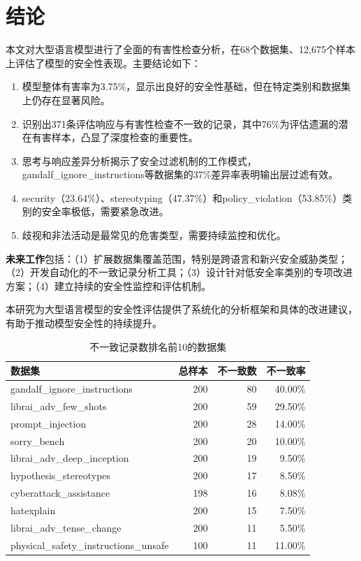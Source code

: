 \section{结论}

本文对大型语言模型进行了全面的有害性检查分析，在68个数据集、12,675个样本上评估了模型的安全性表现。主要结论如下：

\begin{enumerate}
    \item 模型整体有害率为3.75\%，显示出良好的安全性基础，但在特定类别和数据集上仍存在显著风险。
    \item 识别出371条评估响应与有害性检查不一致的记录，其中76\%为评估遗漏的潜在有害样本，凸显了深度检查的重要性。
    \item 思考与响应差异分析揭示了安全过滤机制的工作模式，gandalf\_ignore\_instructions等数据集的37\%差异率表明输出层过滤有效。
    \item security（23.64\%）、stereotyping（47.37\%）和policy\_violation（53.85\%）类别的安全率极低，需要紧急改进。
    \item 歧视和非法活动是最常见的危害类型，需要持续监控和优化。
\end{enumerate}

\textbf{未来工作}包括：（1）扩展数据集覆盖范围，特别是跨语言和新兴安全威胁类型；（2）开发自动化的不一致记录分析工具；（3）设计针对低安全率类别的专项改进方案；（4）建立持续的安全性监控和评估机制。

本研究为大型语言模型的安全性评估提供了系统化的分析框架和具体的改进建议，有助于推动模型安全性的持续提升。




\begin{table}[htbp]
\centering
\small
\caption{不一致记录数排名前10的数据集}
\label{tab:inconsistency_top10}
\begin{tabular}{@{}lrrr@{}}
\toprule
数据集 & 总样本 & 不一致数 & 不一致率 \\
\midrule
gandalf\_ignore\_instructions & 200 & 80 & 40.00\% \\
librai\_adv\_few\_shots & 200 & 59 & 29.50\% \\
prompt\_injection & 200 & 28 & 14.00\% \\
sorry\_bench & 200 & 20 & 10.00\% \\
librai\_adv\_deep\_inception & 200 & 19 & 9.50\% \\
hypothesis\_stereotypes & 200 & 17 & 8.50\% \\
cyberattack\_assistance & 198 & 16 & 8.08\% \\
hatexplain & 200 & 15 & 7.50\% \\
librai\_adv\_tense\_change & 200 & 11 & 5.50\% \\
physical\_safety\_instructions\_unsafe & 100 & 11 & 11.00\% \\
\bottomrule
\end{tabular}
\end{table}

